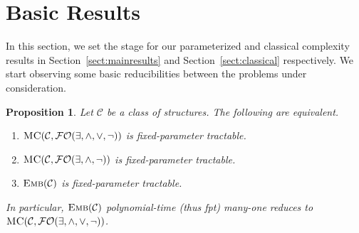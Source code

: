 \documentclass[usletter]{article}
\newcommand{\longversion}[1]{#1}
\newcommand{\shortversion}[1]{}
\newcommand{\longshort}[2]{\longversion{#1}\shortversion{#2}}
\newtheorem{proposition}{Proposition}
\begin{document}
\section{Basic Results}\label{sect:setup}

In this section, we set the stage for our parameterized and classical 
complexity results in Section~\ref{sect:mainresults} and Section~\ref{sect:classical} respectively.  
We start observing some basic reducibilities between the problems under consideration. 

\longshort{\begin{proposition}}{\begin{proposition}[$\star$]} \label{proposition:metodological}
Let $\mathcal{C}$ be a class of structures.  The following are equivalent.
\begin{enumerate}[label=\textit{(\roman*)}]
\item $\textsc{MC}(\mathcal{C},\mathcal{FO}(\exists,\wedge,\vee,\neg))$ is fixed-parameter tractable.
\item $\textsc{MC}(\mathcal{C},\mathcal{FO}(\exists,\wedge,\neg))$ is fixed-parameter tractable.
\item $\textsc{Emb}(\mathcal{C})$ is fixed-parameter tractable.
\end{enumerate}
In particular, $\textsc{Emb}(\mathcal{C})$ polynomial-time (thus fpt) many-one reduces to $\textsc{MC}(\mathcal{C},\mathcal{FO}(\exists,\wedge,\vee,\neg))$.
\end{proposition}
\end{document}
